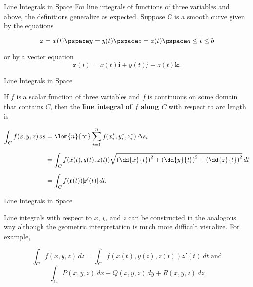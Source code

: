 \documentclass[11pt,english,
handout
]{beamer}
\begin{document}
\begin{frame}{Line Integrals in Space}
\small
For line integrals of functions of three variables and above, the definitions generalize as expected. \pause Suppose $C$ is a smooth curve given by the equations

\[
x=x(t)\pspace y=y(t)\pspace z=z(t)\pspace a\leq t\leq b
\]

or by a vector equation 
\[
\mathbf{r}(t)=x(t)\mathbf{i}+y(t)\mathbf{j}+z(t)\mathbf{k}.
\]
\end{frame}













\begin{frame}[t]{Line Integrals in Space}
\small

\begin{definition}
If $f$ is a scalar function of three variables and $f$ is continuous on some domain that contains $C$, then the \textbf{line integral of $f$ along $C$} with respect to arc length is 

\begin{align*}
\int_Cf(x,y,z)\,ds&=\lom{n}{\infty}\sum_{i=1}^nf(x_i^*,y_i^*,z_i^*)\,\Delta s_i\\[2mm]
&=\int_Cf(x(t),y(t),z(t))\sqrt{\left(\dd{x}{t}\right)^2+\left(\dd{y}{t}\right)^2+\left(\dd{z}{t}\right)^2}\,dt\\[2mm]
&=\int_Cf(\mathbf{r}(t))|\mathbf{r}'(t)|\,dt.
\end{align*}
\end{definition}
\end{frame}









\begin{frame}[t]{Line Integrals in Space}
\small

Line integrals with respect to $x$, $y$, and $z$ can be constructed in the analogous way although the geometric interpretation is much more difficult visualize. For example,

\[
\int_Cf(x,y,z)\,dz=\int_Cf(x(t),y(t),z(t))z'(t)\,dt\text{ and}
\]
\[
\int_CP(x,y,z)\,dx+Q(x,y,z)\,dy+R(x,y,z)\,dz
\]
\end{frame}
\end{document}
